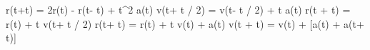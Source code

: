 r(t+\Delta t) = 2r(t) - r(t- \Delta t) + \Delta t^2 \cdot a(t)
v(t+ \Delta t / 2) = v(t- \Delta t / 2) + \Delta t \cdot a(t)
r(t + \Delta t) = r(t) + \Delta t \cdot v(t+ \Delta t / 2)
r(t+ \Delta t) = r(t) + \Delta t \cdot v(t) +  \cdot a(t)
v(t + \Delta t) = v(t) +  [a(t) + a(t+ \Delta t)]